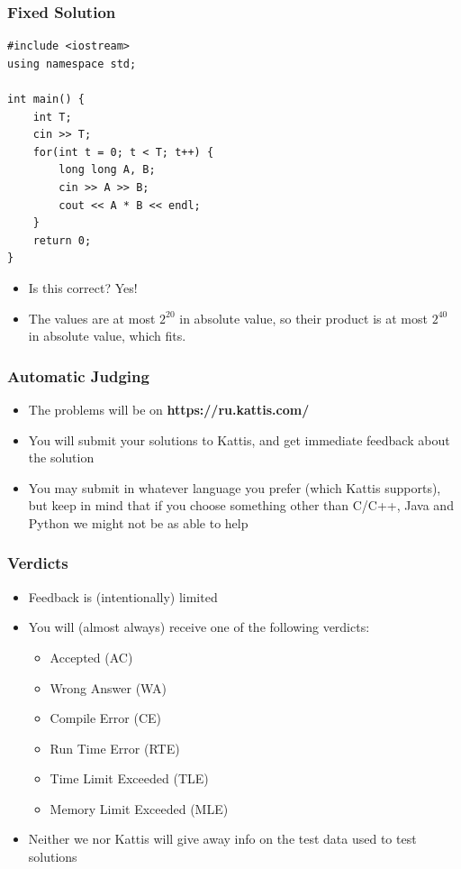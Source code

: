 \documentclass{beamer}
\begin{document}
\begin{frame}
    \frametitle{Fixed Solution}
	\begin{scriptsize}
        \begin{verbatim}
#include <iostream>
using namespace std;

int main() {
    int T;
    cin >> T;
    for(int t = 0; t < T; t++) {
        long long A, B;
        cin >> A >> B;
        cout << A * B << endl;
    }
    return 0;
}
        \end{verbatim}
    \end{scriptsize}
    \begin{itemize}
        \item<2-> Is this correct?  {\alert{Yes!}}
        \item<3-> The values are at most $2^{20}$ in absolute value, so their product is at most $2^{40}$ in absolute value, which fits. 
    \end{itemize}
\end{frame}

\begin{frame}[plain]
    \frametitle{Automatic Judging}
    \begin{itemize}
        \item The problems will be on \textbf{https://ru.kattis.com/}
        \item You will submit your solutions to Kattis, and get immediate feedback about the solution
        \item You may submit in whatever language you prefer (which Kattis supports), but keep in mind that if you choose something other than C/C++, Java and Python we might not be as able to help
    \end{itemize}
\end{frame}

\begin{frame}[plain]
    \frametitle{Verdicts}
    \begin{itemize}
        \item Feedback is (intentionally) limited
        \item You will (almost always) receive one of the following verdicts:
        \begin{itemize}
            \item Accepted (AC)
            \item Wrong Answer (WA)
            \item Compile Error (CE)
            \item Run Time Error (RTE)
            \item Time Limit Exceeded (TLE)
            \item Memory Limit Exceeded (MLE)
        \end{itemize}
        \item Neither we nor Kattis will give away info on the test data used to test solutions
    \end{itemize}
\end{frame}
\end{document}
